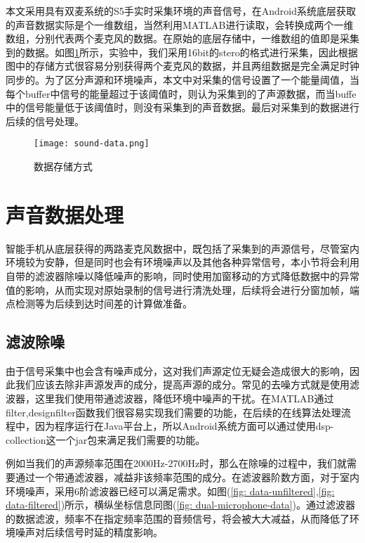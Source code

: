 \documentclass[winfonts,oneside]{njuthesis}
\begin{document}
		本文采用具有双麦系统的S5手实时采集环境的声音信号，在Android系统底层获取的声音数据实际是个一维数组，当然利用MATLAB进行读取，会转换成两个一维数组，分别代表两个麦克风的数据。在原始的底层存储中，一维数组的值即是采集到的数据。如图\ref{fig: sound-data}所示，实验中，我们采用16bit的stero的格式进行采集，因此根据图中的存储方式很容易分别获得两个麦克风的数据，并且两组数据是完全满足时钟同步的。为了区分声源和环境噪声，本文中对采集的信号设置了一个能量阈值，当每个buffer中信号的能量超过于该阈值时，则认为采集到的了声源数据，而当buffe中的信号能量低于该阈值时，则没有采集到的声音数据。最后对采集到的数据进行后续的信号处理。
		
		\begin{figure}[H]
			\centering
			\texttt{[image: sound-data.png]} 
			\caption{数据存储方式}
			\label{fig: sound-data}
		\end{figure}
	
	\section{声音数据处理}
	
		智能手机从底层获得的两路麦克风数据中，既包括了采集到的声源信号，尽管室内环境较为安静，但是同时也会有环境噪声以及其他各种异常信号，本小节将会利用自带的滤波器除噪以降低噪声的影响，同时使用加窗移动的方式降低数据中的异常值的影响，从而实现对原始录制的信号进行清洗处理，后续将会进行分窗加帧，端点检测等为后续到达时间差的计算做准备。

		\subsection{滤波除噪}
			
			由于信号采集中也会含有噪声成分，这对我们声源定位无疑会造成很大的影响，因此我们应该去除非声源发声的成分，提高声源的成分。常见的去噪方式就是使用滤波器，这里我们使用带通滤波器，降低环境中噪声的干扰。在MATLAB通过filter,designfilter函数我们很容易实现我们需要的功能，在后续的在线算法处理流程中，因为程序运行在Java平台上，所以Android系统方面可以通过使用dsp-collection这一个jar包来满足我们需要的功能。
			
			例如当我们的声源频率范围在2000Hz-2700Hz时，那么在除噪的过程中，我们就需要通过一个带通滤波器，减益非该频率范围的成分。在滤波器阶数方面，对于室内环境噪声，采用6阶滤波器已经可以满足需求。如图(\ref{fig: data-unfiltered},\ref{fig: data-filtered})所示，横纵坐标信息同图(\ref{fig: dual-microphone-data})。通过滤波器的数据滤波，频率不在指定频率范围的音频信号，将会被大大减益，从而降低了环境噪声对后续信号时延的精度影响。
			
\end{document}
